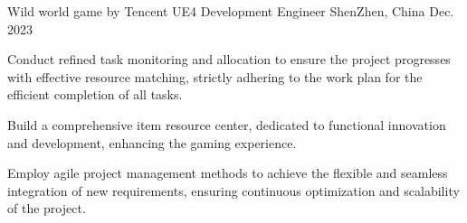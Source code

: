 

\begin{cventries}

  \cventry
    {Wild world game by Tencent} %
    {UE4 Development Engineer} %
    {ShenZhen, China} %
    {Dec. 2023} %
    {
      \begin{cvitems} %
        \item {Conduct refined task monitoring and allocation to ensure the project progresses with effective resource matching, strictly adhering to the work plan for the efficient completion of all tasks.}
        \item {Build a comprehensive item resource center, dedicated to functional innovation and development, enhancing the gaming experience.}
        \item {Employ agile project management methods to achieve the flexible and seamless integration of new requirements, ensuring continuous optimization and scalability of the project.}
      \end{cvitems}
    }

\end{cventries}
